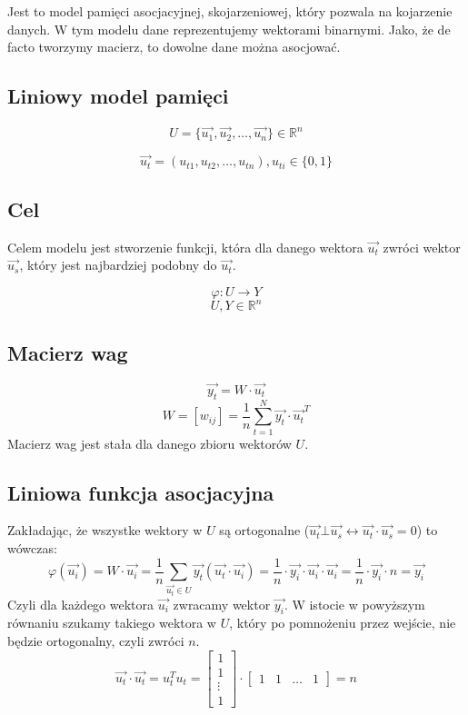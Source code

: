 \documentclass{../notatki}
\begin{document}
Jest to model pamięci asocjacyjnej, skojarzeniowej, który pozwala na kojarzenie
danych. W tym modelu dane reprezentujemy wektorami binarnymi. Jako, że de facto
tworzymy macierz, to dowolne dane można asocjować.

\subsection{Liniowy model pamięci}

$$
U = \{\vec{u_1}, \vec{u_2}, \dots, \vec{u_n}\} \in \mathbb{R}^n
$$

$$
\vec{u_t} = (u_{t1}, u_{t2}, \dots, u_{tn}), u_{ti} \in \{0, 1\}
$$

\subsection{Cel}

Celem modelu jest stworzenie funkcji, która dla danego wektora $\vec{u_t}$
zwróci wektor $\vec{u_s}$, który jest najbardziej podobny do $\vec{u_t}$.

$$
\varphi : U \rightarrow Y
$$
$$
U, Y \in \mathbb{R}^n
$$

\subsection{Macierz wag}

$$
\vec{y_t} = W \cdot \vec{u_t}
$$
$$
W = [w_{ij}] = \frac{1}{n} \sum_{t = 1}^{N} \vec{y_t} \cdot \vec{u_t}^T
$$
Macierz wag jest stała dla danego zbioru wektorów $U$.

\subsection{Liniowa funkcja asocjacyjna}

Zakładając, że wszystke wektory w $U$ są ortogonalne ($\vec{u_t} \bot
\vec{u_s} \leftrightarrow \vec{u_t} \cdot \vec{u_s} = 0$) to wówczas:
$$
\varphi(\vec{u_i}) = W \cdot \vec{u_i} = \frac{1}{n} \sum_{\vec{u_t} \in U}
\vec{y_t}(\vec{u_t}\cdot \vec{u_i}) = \frac{1}{n} \cdot \vec{y_i}
\cdot \vec{u_i} \cdot \vec{u_i} = \frac{1}{n} \cdot \vec{y_i} \cdot n
= \vec{y_i}
$$
Czyli dla każdego wektora $\vec{u_i}$ zwracamy wektor $\vec{y_i}$.
W istocie w powyższym równaniu szukamy takiego wektora w $U$, który
po pomnożeniu przez wejście, nie będzie ortogonalny, czyli zwróci $n$.
$$
\vec{u_t} \cdot \vec{u_t} = u_t^Tu_t =
\begin{bmatrix}
  1 \\ 1 \\ \vdots \\ 1
\end{bmatrix} \cdot
\begin{bmatrix}
  1 & 1 & \dots & 1
\end{bmatrix} = n
$$
\end{document}
